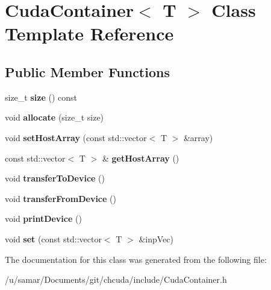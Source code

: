 \hypertarget{classCudaContainer}{}\section{Cuda\+Container$<$ T $>$ Class Template Reference}
\label{classCudaContainer}
\subsection*{Public Member Functions}
\begin{DoxyCompactItemize}
\item 
\hypertarget{classCudaContainer_a38277438880c3e1b2b44c13f5928ac6d}{}\label{classCudaContainer_a38277438880c3e1b2b44c13f5928ac6d} 
size\+\_\+t {\bfseries size} () const
\item 
\hypertarget{classCudaContainer_a708fda937e504d25ddfe1081ac2d96da}{}\label{classCudaContainer_a708fda937e504d25ddfe1081ac2d96da} 
void {\bfseries allocate} (size\+\_\+t size)
\item 
\hypertarget{classCudaContainer_ae775cb3d0fd2929ff7f608bf19efd493}{}\label{classCudaContainer_ae775cb3d0fd2929ff7f608bf19efd493} 
void {\bfseries set\+Host\+Array} (const std\+::vector$<$ T $>$ \&array)
\item 
\hypertarget{classCudaContainer_a5a03f48d9414f2900996f77503c78ae8}{}\label{classCudaContainer_a5a03f48d9414f2900996f77503c78ae8} 
const std\+::vector$<$ T $>$ \& {\bfseries get\+Host\+Array} ()
\item 
\hypertarget{classCudaContainer_a6137c9e3b52fbe34b298b86de2e875e0}{}\label{classCudaContainer_a6137c9e3b52fbe34b298b86de2e875e0} 
void {\bfseries transfer\+To\+Device} ()
\item 
\hypertarget{classCudaContainer_a1bbe7a7a89334d96338f6879785628bb}{}\label{classCudaContainer_a1bbe7a7a89334d96338f6879785628bb} 
void {\bfseries transfer\+From\+Device} ()
\item 
\hypertarget{classCudaContainer_ac57550f6bc543449a98705106552efdf}{}\label{classCudaContainer_ac57550f6bc543449a98705106552efdf} 
void {\bfseries print\+Device} ()
\item 
\hypertarget{classCudaContainer_a1900957efd8ecf717d181e9f3b29c911}{}\label{classCudaContainer_a1900957efd8ecf717d181e9f3b29c911} 
void {\bfseries set} (const std\+::vector$<$ T $>$ \&inp\+Vec)
\end{DoxyCompactItemize}


The documentation for this class was generated from the following file\+:\begin{DoxyCompactItemize}
\item 
/u/samar/\+Documents/git/chcuda/include/Cuda\+Container.\+h\end{DoxyCompactItemize}
